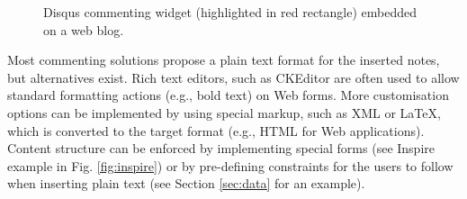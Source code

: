 \begin{figure}[!ht]
  \centering
  \caption[Disqus commenting widget embedded on a web blog]
          {Disqus commenting widget (highlighted in red rectangle) embedded on a web blog.}
  \label{fig:disqus}
\end{figure}

Most commenting solutions propose a plain text format for the inserted notes,
but alternatives exist. Rich text editors, such as CKEditor \cite{ref:cked} are
often used to allow standard formatting actions (e.g., bold text) on Web forms.
More customisation options can be implemented by using special markup, such as
XML or LaTeX, which is converted to the target format (e.g., HTML for Web
applications). Content structure can be enforced by implementing special forms
(see Inspire example in Fig. \ref{fig:inspire}) or by pre-defining constraints
for the users to follow when inserting plain text (see Section \ref{sec:data}
for an example).

